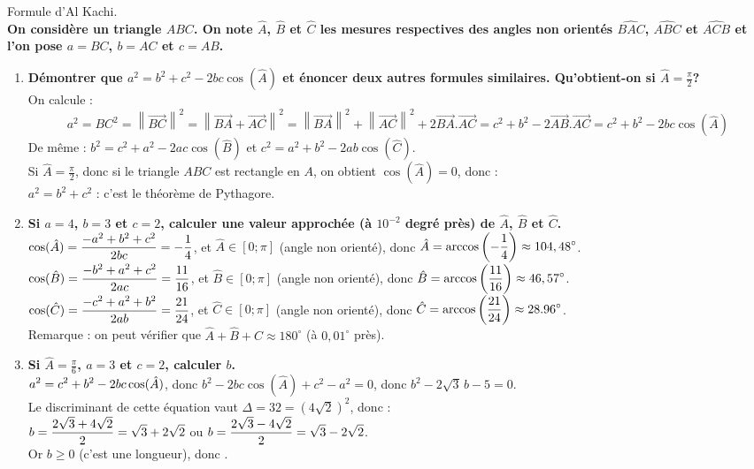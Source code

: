 \documentclass[a4paper, 11pt]{article}
\begin{document}
\begin{correction}  \; Formule d'Al Kachi.\\
	\textbf{On consid\`ere un triangle $ABC$. On note $\hat{A}$, $\hat{B}$ et $\hat{C}$ les mesures respectives des angles non orient\'es $\widehat{BAC}$, $\widehat{ABC}$ et $\widehat{ACB}$ et l'on pose $a=BC$, $b=AC$ et $c=AB$.}
	\begin{enumerate}
		\item \textbf{D\'emontrer que $a^2=b^2+c^2-2bc\cos(\hat{A})$ et \'enoncer deux autres formules similaires. Qu'obtient-on si $\hat{A} = \frac{\pi}{2}$?}\\
		      On calcule :
		      $$ a^2=BC^2=\left\|\overrightarrow{BC}\right\|^2 = \left\|\overrightarrow{BA}+\overrightarrow{AC}\right\|^2 = \left\|\overrightarrow{BA}\right\|^2+\left\|\overrightarrow{AC}\right\|^2+2 \overrightarrow{BA}.\overrightarrow{AC} = c^2+b^2-2 \overrightarrow{AB}.\overrightarrow{AC} = c^2+b^2-2bc\cos(\hat{A})$$
		      De m\^eme : $b^2=c^2+a^2-2ac\cos(\hat{B})$ et  $c^2=a^2+b^2-2ab\cos(\hat{C})$.\\
		      Si $\hat{A} = \frac{\pi}{2}$, donc si le triangle $ABC$ est rectangle en $A$, on obtient $\cos(\hat{A})=0$, donc :\\$a^2=b^2+c^2$ : c'est le th\'eor\`eme de Pythagore.
		\item \textbf{Si $a=4$, $b=3$ et $c=2$, calculer une valeur approch\'ee (\`a $10^{-2}$ degr\'e pr\`es) de $\hat{A}$, $\hat{B}$ et $\hat{C}$.}\\
		      $\cos(\hat{A})=\displaystyle\frac{-a^2+b^2+c^2}{2bc}=-\frac{1}{4}$, et $\hat{A} \in [0;\pi]$ (angle non orient\'e), donc $\displaystyle\hat{A} = \arccos\left(-\frac{1}{4}\right) \approx 104,48^{\circ}$.\\
		      $\cos(\hat{B})=\displaystyle\frac{-b^2+a^2+c^2}{2ac}=\frac{11}{16}$, et $\hat{B} \in [0;\pi]$ (angle non orient\'e), donc $\displaystyle\hat{B} = \arccos\left(\frac{11}{16}\right) \approx 46,57^{\circ}$.\\
		      $\cos(\hat{C})=\displaystyle\frac{-c^2+a^2+b^2}{2ab}=\frac{21}{24}$, et $\hat{C} \in [0;\pi]$ (angle non orient\'e), donc $\displaystyle\hat{C} = \arccos\left(\frac{21}{24}\right) \approx 28.96^{\circ}$.\\
		      Remarque : on peut v\'erifier que $\hat{A}+\hat{B}+\hat{C}\approx 180^{\circ}$ (\`a $0,01^{\circ}$ pr\`es).\\
		\item \textbf{Si $\hat{A} = \frac{\pi}{6}$, $a=3$ et $c=2$, calculer $b$.}\\
		      $\displaystyle a^2=c^2+b^2-2bc\cos(\hat{A})$, donc $b^2-2bc\cos(\hat{A})+c^2-a^2=0$, donc $b^2-2\sqrt{3}\, b-5=0$.\\
		      Le discriminant de cette \'equation vaut $\Delta=32=\left(4\sqrt{2}\right)^2$, donc :\\
		      $b=\displaystyle\frac{2\sqrt{3}+4\sqrt{2}}{2}=\sqrt{3}+2\sqrt{2}$ ou $b=\displaystyle\frac{2\sqrt{3}-4\sqrt{2}}{2}=\sqrt{3}-2\sqrt{2}$.\\
		      Or $b \geq 0$ (c'est une longueur), donc .
	\end{enumerate}
\end{correction}
\end{document}
